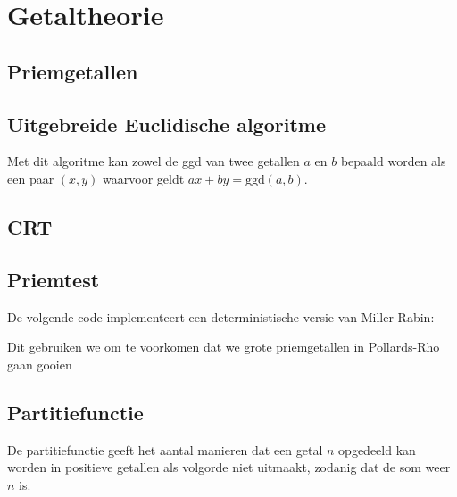 \documentclass[10pt,a4paper,titlepage]{article}
\begin{document}
\section{Getaltheorie}
\subsection{Priemgetallen}



\subsection{Uitgebreide Euclidische algoritme}
Met dit algoritme kan zowel de ggd van twee getallen $a$ en $b$ bepaald worden als een paar $(x,y)$ waarvoor geldt $ax + by = \textrm{ggd}(a,b)$.

\begin{minipage}{0.5\textwidth}

\end{minipage}
\begin{minipage}{0.5\textwidth}

\end{minipage}

\subsection{CRT}


\subsection{Priemtest}

De volgende code implementeert een deterministische versie van Miller-Rabin:



Dit gebruiken we om te voorkomen dat we grote priemgetallen in Pollards-Rho gaan gooien


\subsection{Partitiefunctie}

De partitiefunctie geeft het aantal manieren dat een getal $n$ opgedeeld kan worden in positieve getallen als volgorde niet uitmaakt, zodanig dat de som weer $n$ is.
\end{document}
